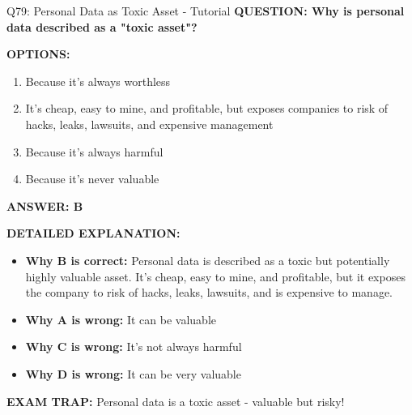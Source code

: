 \documentclass[8pt]{beamer}
\begin{document}
	\begin{frame}{Q79: Personal Data as Toxic Asset - Tutorial}
		\fontsize{6.5}{7.5}\selectfont
		\textbf{QUESTION: Why is personal data described as a "toxic asset"?}
		
		\vspace{0.1cm}
		\textbf{OPTIONS:}
		\begin{enumerate}
			\item Because it's always worthless
			\item It's cheap, easy to mine, and profitable, but exposes companies to risk of hacks, leaks, lawsuits, and expensive management
			\item Because it's always harmful
			\item Because it's never valuable
		\end{enumerate}
		
		\vspace{0.1cm}
		\textcolor{myblue}{\textbf{ANSWER: B}}
		
		\vspace{0.1cm}
		\textbf{DETAILED EXPLANATION:}
		\begin{itemize}
			\item \textbf{Why B is correct:} Personal data is described as a toxic but potentially highly valuable asset. It's cheap, easy to mine, and profitable, but it exposes the company to risk of hacks, leaks, lawsuits, and is expensive to manage.
			\item \textbf{Why A is wrong:} It can be valuable
			\item \textbf{Why C is wrong:} It's not always harmful
			\item \textbf{Why D is wrong:} It can be very valuable
		\end{itemize}
		
		\textcolor{myred}{\textbf{EXAM TRAP:}} Personal data is a \textcolor{myblue}{toxic asset} - valuable but risky!
	\end{frame}
	
\end{document}
